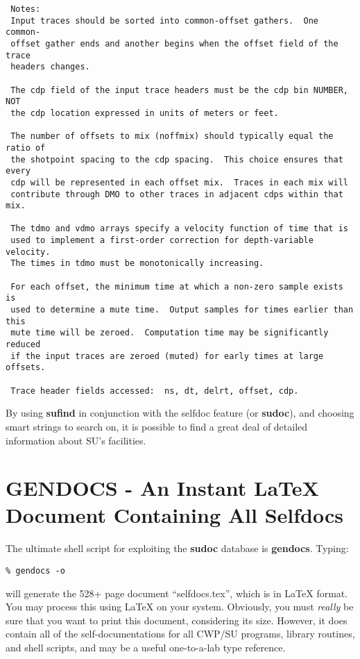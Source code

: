 {{{\begin{verbatim}
 Notes:                                                         
 Input traces should be sorted into common-offset gathers.  One common- 
 offset gather ends and another begins when the offset field of the trace
 headers changes.                                                       
                                                                        
 The cdp field of the input trace headers must be the cdp bin NUMBER, NOT
 the cdp location expressed in units of meters or feet.         
                                                                        
 The number of offsets to mix (noffmix) should typically equal the ratio of
 the shotpoint spacing to the cdp spacing.  This choice ensures that every
 cdp will be represented in each offset mix.  Traces in each mix will   
 contribute through DMO to other traces in adjacent cdps within that mix.
                                                                        
 The tdmo and vdmo arrays specify a velocity function of time that is   
 used to implement a first-order correction for depth-variable velocity.
 The times in tdmo must be monotonically increasing.                    
                                                                        
 For each offset, the minimum time at which a non-zero sample exists is 
 used to determine a mute time.  Output samples for times earlier than this
 mute time will be zeroed.  Computation time may be significantly reduced
 if the input traces are zeroed (muted) for early times at large offsets.
                                                                        
 Trace header fields accessed:  ns, dt, delrt, offset, cdp.             
\end{verbatim}}\noindent
By using {\bf sufind\/} in conjunction with the selfdoc feature (or {\bf sudoc}),
and choosing smart strings to search on, it is possible to find
a great deal of detailed information about SU's facilities.

\section{GENDOCS - An Instant LaTeX Document Containing All Selfdocs}
The ultimate shell script for exploiting the {\bf sudoc\/} database is
{\bf gendocs}. Typing:
{\small \begin{verbatim}
% gendocs -o
\end{verbatim}}\noindent
will generate the 528+ page document ``selfdocs.tex'', which is
in LaTeX format. You may process this using LaTeX on your system.
Obviously, you must {\em really\/} be sure that you want to print this
document, considering its size.
However, it does contain all of the self-documentations for all
CWP/SU programs, library routines, and shell scripts, and may be
a useful one-to-a-lab type reference.

}}
